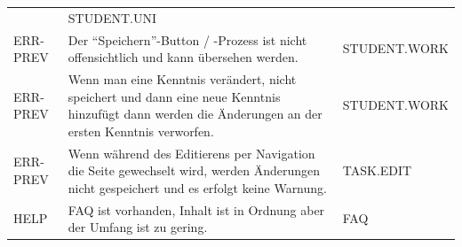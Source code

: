 \documentclass[
  12pt,
  ngerman,
  a4paper,
]{article}
\begin{document}
\begin{longtable}[]{@{}lll@{}}
\begin{minipage}[t]{0.55\columnwidth}
\end{minipage} & \begin{minipage}[t]{0.23\columnwidth}\raggedright
STUDENT.UNI\strut
\end{minipage}\tabularnewline
\begin{minipage}[t]{0.14\columnwidth}\raggedright
ERR-PREV\strut
\end{minipage} & \begin{minipage}[t]{0.55\columnwidth}\raggedright
Der ``Speichern''-Button / -Prozess ist nicht offensichtlich und kann
übersehen werden.\strut
\end{minipage} & \begin{minipage}[t]{0.23\columnwidth}\raggedright
STUDENT.WORK\strut
\end{minipage}\tabularnewline
\begin{minipage}[t]{0.14\columnwidth}\raggedright
ERR-PREV\strut
\end{minipage} & \begin{minipage}[t]{0.55\columnwidth}\raggedright
Wenn man eine Kenntnis verändert, nicht speichert und dann eine neue
Kenntnis hinzufügt dann werden die Änderungen an der ersten Kenntnis
verworfen.\strut
\end{minipage} & \begin{minipage}[t]{0.23\columnwidth}\raggedright
STUDENT.WORK\strut
\end{minipage}\tabularnewline
\begin{minipage}[t]{0.14\columnwidth}\raggedright
ERR-PREV\strut
\end{minipage} & \begin{minipage}[t]{0.55\columnwidth}\raggedright
Wenn während des Editierens per Navigation die Seite gewechselt wird,
werden Änderungen nicht gespeichert und es erfolgt keine Warnung.\strut
\end{minipage} & \begin{minipage}[t]{0.23\columnwidth}\raggedright
TASK.EDIT\strut
\end{minipage}\tabularnewline
\begin{minipage}[t]{0.14\columnwidth}\raggedright
HELP\strut
\end{minipage} & \begin{minipage}[t]{0.55\columnwidth}\raggedright
FAQ ist vorhanden, Inhalt ist in Ordnung aber der Umfang ist zu
gering.\strut
\end{minipage} & \begin{minipage}[t]{0.23\columnwidth}\raggedright
FAQ\strut
\end{minipage}\tabularnewline

\end{longtable}
\end{document}
